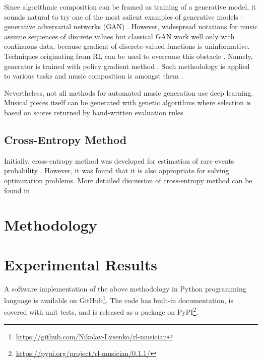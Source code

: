 \documentclass{article}
\begin{document}
Since algorithmic composition can be framed as training of a generative model, it sounds natural to try one of the most salient examples of generative models -- generative adversarial networks (GAN) \cite{goodfellow2014gan}. However, widespread notations for music assume sequences of discrete values but classical GAN work well only with continuous data, because gradient of discrete-valued functions is uninformative. Techniques originating from RL can be used to overcome this obstacle \cite{yu2016seqgan,hjelm2017boundary}. Namely, generator is trained with policy gradient method \cite{williams1992simple}. Such methodology is applied to various tasks and music composition is amongst them \cite{limaguimaraes2017objective}.

Nevertheless, not all methods for automated music generation use deep learning. Musical pieces itself can be generated with genetic algorithms \cite{felice2002genorchestra} where selection is based on scores returned by hand-written evaluation rules.

\subsection{Cross-Entropy Method}
\label{subsec:crossentropy}

Initially, cross-entropy method was developed for estimation of rare events probability \cite{rubinstein1997optimization}. However, it was found that it is also appropriate for solving optimization problems. More detailed discussion of cross-entropy method can be found in \cite{boer2005tutorial}.


\section{Methodology}
\label{sec:methodology}


\section{Experimental Results}
\label{sec:results}

A software implementation of the above methodology in Python programming language is available on GitHub\footnote{\url{https://github.com/Nikolay-Lysenko/rl-musician}}. The code has built-in documentation, is covered with unit tests, and is released as a package on PyPI\footnote{\url{https://pypi.org/project/rl-musician/0.1.1/}}.
\end{document}
